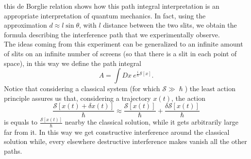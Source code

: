 this de Borglie relation shows how this path integral interpretation is an appropriate interpretation of quantum mechanics. In fact, using the approximation $d\approx l\sin\theta$, with $l$ distance between the two slits, we obtain the formula describing the interference path that we experimentally observe.\\
The ideas coming from this experiment can be generalized to an infinite amount of slits on an infinite number of screens (so that there is a slit in each point of space), in this way we define the path integral
\begin{equation*}
    A=\int Dx\ e^{\frac{i}{\hslash}\mathcal{S} [x]}.
\end{equation*}
Notice that considering a classical system (for which $\mathcal{S} \gg\hslash$) the least action principle assures us that, considering a trajectory $x(t)$, the action
\begin{equation*}
    \frac{\mathcal{S} [x(t)+\delta x(t)]}{\hslash}\approx \frac{\mathcal{S} [x(t)]}{\hslash}+ \frac{\delta\mathcal{S} [x(t)]}{\hslash}
\end{equation*}
is equals to $\frac{\mathcal{S} [x(t)]}{\hslash}$ nearby the classical solution, while it gets arbitrarily large far from it. In this way we get constructive interference around the classical solution while, every elsewhere destructive interference makes vanish all the other paths. 
